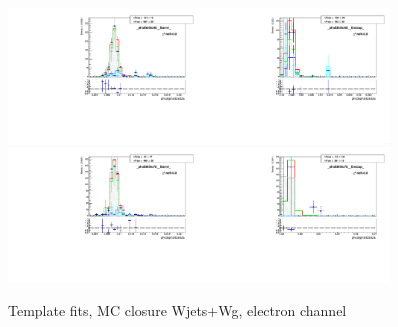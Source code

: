 \begin{figure}[htb]
\begin{center}
   \includegraphics[width=0.45\textwidth]{../figs/figs_v11/ELECTRON_WGamma/MCclosureWjetsPlusWg/c_TEMPL_SIHIH_UNblind__phoEt55to65__Barrel__RooFit_MCclosure.pdf}\includegraphics[width=0.45\textwidth]{../figs/figs_v11/ELECTRON_WGamma/MCclosureWjetsPlusWg/c_TEMPL_SIHIH_UNblind__phoEt55to65__Endcap__RooFit_MCclosure.pdf}\\
   \includegraphics[width=0.45\textwidth]{../figs/figs_v11/ELECTRON_WGamma/MCclosureWjetsPlusWg/c_TEMPL_SIHIH_UNblind__phoEt65to75__Barrel__RooFit_MCclosure.pdf}\includegraphics[width=0.45\textwidth]{../figs/figs_v11/ELECTRON_WGamma/MCclosureWjetsPlusWg/c_TEMPL_SIHIH_UNblind__phoEt65to75__Endcap__RooFit_MCclosure.pdf}\\
  \label{fig:templateFits_MCclosureWjetsPlusWg_SIHIH_ELECTRON_2}
  \caption{Template fits, MC closure Wjets+Wg, electron channel}
  \end{center}
\end{figure}

